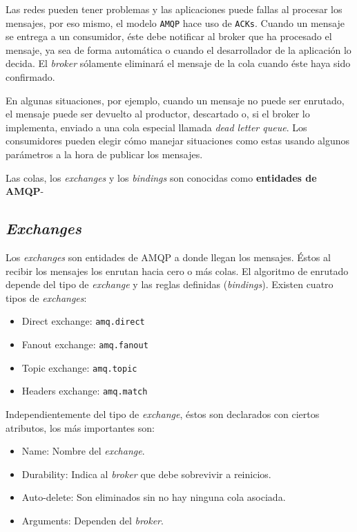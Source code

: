 Las redes pueden tener problemas y las aplicaciones puede fallas al procesar los
mensajes, por eso mismo, el modelo \texttt{AMQP} hace uso de \texttt{ACKs}. Cuando
un mensaje se entrega a un consumidor, éste debe notificar al broker que ha procesado
el mensaje, ya sea de forma automática o cuando el desarrollador de la aplicación
lo decida. El \emph{broker} sólamente eliminará el mensaje de la cola cuando
éste haya sido confirmado.

En algunas situaciones, por ejemplo, cuando un mensaje no puede ser enrutado,
el mensaje puede ser devuelto al productor, descartado o, si el broker lo implementa,
enviado a una cola especial llamada \emph{dead letter queue}. Los consumidores pueden
elegir cómo manejar situaciones como estas usando algunos parámetros a la hora de
publicar los mensajes.

Las colas, los \emph{exchanges} y los \emph{bindings} son conocidas como
\textbf{entidades de AMQP}-

\subsection{\emph{Exchanges}}

Los \emph{exchanges} son entidades de AMQP a donde llegan los mensajes. Éstos
al recibir los mensajes los enrutan hacia cero o más colas. El algoritmo de
enrutado depende del tipo de \emph{exchange} y las reglas definidas (\emph{bindings}).
Existen cuatro tipos de \emph{exchanges}:

\begin{itemize}\itemsep1pt \parskip0pt 
\item Direct exchange: \texttt{amq.direct}
\item Fanout exchange: \texttt{amq.fanout}
\item Topic exchange:	\texttt{amq.topic}
\item Headers exchange:	\texttt{amq.match}
\end{itemize}

Independientemente del tipo de \emph{exchange}, éstos son declarados con ciertos
atributos, los más importantes son:

\begin{itemize}\itemsep1pt \parskip0pt 
\item Name: Nombre del \emph{exchange}.
\item Durability: Indica al \emph{broker} que debe sobrevivir a
reinicios.
\item Auto-delete: Son eliminados sin no hay ninguna cola asociada.
\item Arguments: Dependen del \emph{broker}.
\end{itemize}

